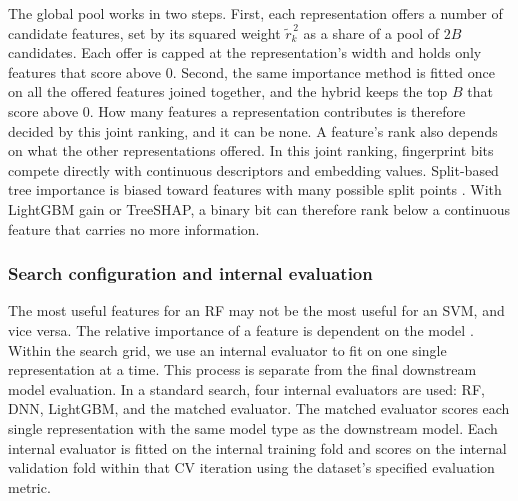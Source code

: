The global pool works in two steps. First, each representation offers a number of candidate features, set by its squared weight $\tilde r_k^{\,2}$ as a share of a pool of $2B$ candidates. Each offer is capped at the representation's width and holds only features that score above 0. Second, the same importance method is fitted once on all the offered features joined together, and the hybrid keeps the top $B$ that score above 0. How many features a representation contributes is therefore decided by this joint ranking, and it can be none. A feature's rank also depends on what the other representations offered. In this joint ranking, fingerprint bits compete directly with continuous descriptors and embedding values. Split-based tree importance is biased toward features with many possible split points \citep{Strobl2007}. With LightGBM gain or TreeSHAP, a binary bit can therefore rank below a continuous feature that carries no more information.

\subsubsection{Search configuration and internal evaluation}

The most useful features for an RF may not be the most useful for an SVM, and vice versa. The relative importance of a feature is dependent on the model \citep{Dong2020}. Within the search grid, we use an internal evaluator to fit on one single representation at a time. This process is separate from the final downstream model evaluation. In a standard search, four internal evaluators are used: RF, DNN, LightGBM, and the matched evaluator. The matched evaluator scores each single representation with the same model type as the downstream model. Each internal evaluator is fitted on the internal training fold and scores on the internal validation fold within that CV iteration using the dataset's specified evaluation metric. 

